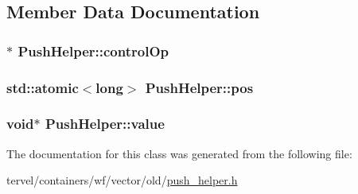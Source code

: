 \subsection{Member Data Documentation}
\hypertarget{class_push_helper_ada3667bd8ed54f5a7d2b0f89bdc08695}{}
\subsubsection[{control\+Op}]{$\ast$ Push\+Helper\+::control\+Op}\label{class_push_helper_ada3667bd8ed54f5a7d2b0f89bdc08695}
\hypertarget{class_push_helper_afc30e140af18bc227c92363abeb504a1}{}
\subsubsection[{pos}]{\setlength{\rightskip}{0pt plus 5cm}std\+::atomic$<$long$>$ Push\+Helper\+::pos}\label{class_push_helper_afc30e140af18bc227c92363abeb504a1}
\hypertarget{class_push_helper_af930dbddbf4d0ea5d0cb723d0dce7790}{}
\subsubsection[{value}]{\setlength{\rightskip}{0pt plus 5cm}void$\ast$ Push\+Helper\+::value}\label{class_push_helper_af930dbddbf4d0ea5d0cb723d0dce7790}


The documentation for this class was generated from the following file\+:\begin{DoxyCompactItemize}
\item 
tervel/containers/wf/vector/old/\hyperlink{push__helper_8h}{push\+\_\+helper.\+h}\end{DoxyCompactItemize}
